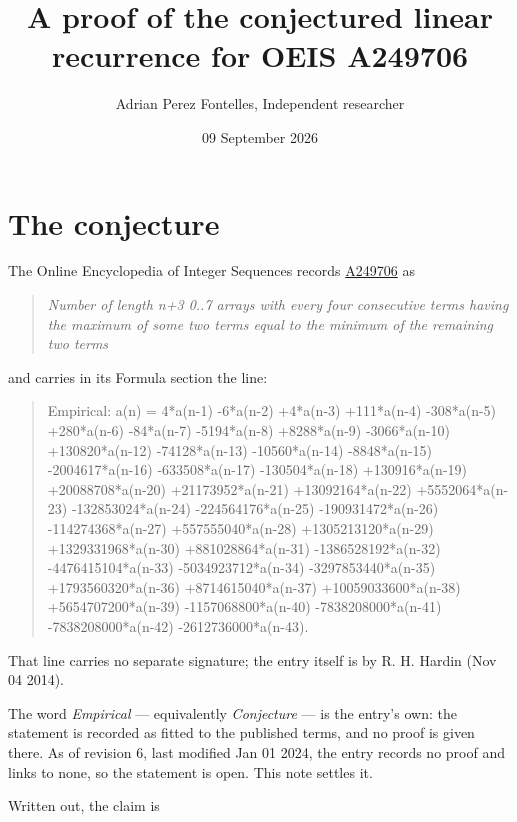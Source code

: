 \documentclass[11pt]{article}
\title{A proof of the conjectured linear recurrence for OEIS A249706}
\author{Adrian Perez Fontelles, Independent researcher}
\date{09 September 2026}
\theoremstyle{definition}
\begin{document}
\maketitle
\section{The conjecture}

The Online Encyclopedia of Integer Sequences records \href{https://oeis.org/A249706}{A249706} as

\begin{quote}\itshape Number of length n+3 0..7 arrays with every four consecutive terms having the maximum of some two terms equal to the minimum of the remaining two terms\end{quote}

and carries in its Formula section the line:

\begin{quote}\ttfamily Empirical: a(n) = 4*a(n-1) -6*a(n-2) +4*a(n-3) +111*a(n-4) -308*a(n-5) +280*a(n-6) -84*a(n-7) -5194*a(n-8) +8288*a(n-9) -3066*a(n-10) +130820*a(n-12) -74128*a(n-13) -10560*a(n-14) -8848*a(n-15) -2004617*a(n-16) -633508*a(n-17) -130504*a(n-18) +130916*a(n-19) +20088708*a(n-20) +21173952*a(n-21) +13092164*a(n-22) +5552064*a(n-23) -132853024*a(n-24) -224564176*a(n-25) -190931472*a(n-26) -114274368*a(n-27) +557555040*a(n-28) +1305213120*a(n-29) +1329331968*a(n-30) +881028864*a(n-31) -1386528192*a(n-32) -4476415104*a(n-33) -5034923712*a(n-34) -3297853440*a(n-35) +1793560320*a(n-36) +8714615040*a(n-37) +10059033600*a(n-38) +5654707200*a(n-39) -1157068800*a(n-40) -7838208000*a(n-41) -7838208000*a(n-42) -2612736000*a(n-43).\end{quote}

That line carries no separate signature; the entry itself is by R. H. Hardin (Nov 04 2014).

The word {\itshape Empirical} --- equivalently {\itshape Conjecture} --- is the entry's own: the statement is recorded as fitted to the published terms, and no proof is given there. As of revision 6, last modified Jan 01 2024, the entry records no proof and links to none, so the statement is open. This note settles it.

Written out, the claim is
\end{document}

